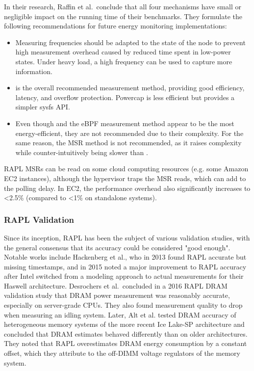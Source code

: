In their research, Raffin et al.\ conclude that all four mechanisms have small or negligible impact on the running time of their benchmarks. They formulate the following recommendations for future energy monitoring implementations:
\begin{itemize}
    \item Measuring frequencies should be adapted to the state of the node to prevent high measurement overhead caused by reduced time spent in low-power states. Under heavy load, a high frequency can be used to capture more information.
    \item {} is the overall recommended measurement method, providing good efficiency, latency, and overflow protection. Powercap is less efficient but provides a simpler sysfs API.
    \item Even though  and the eBPF measurement method appear to be the most energy-efficient, they are not recommended due to their complexity. For the same reason, the MSR method is not recommended, as it raises complexity while counter-intuitively being slower than .
\end{itemize}

RAPL MSRs can be read on some cloud computing resources (e.g. some Amazon EC2 instances), although the hypervisor traps the MSR reads, which can add to the polling delay. In EC2, the performance overhead also significantly increases to <2.5\% (compared to <1\% on standalone systems)\parencite{jay2023experimental}.

\subsubsection{RAPL Validation}
\label{sec:raplvalidation}

Since its inception, RAPL has been the subject of various validation studies, with the general consensus that its accuracy could be considered "good enough"\parencite{raffin2024dissecting}. Notable works include Hackenberg et al., who in 2013 found RAPL accurate but missing timestamps\parencite{hackenberg2013power}, and in 2015 noted a major improvement to RAPL accuracy after Intel switched from a modeling approach to actual measurements for their Haswell architecture\parencite{hackenberg2015energy}. Desrochers et al.\ concluded in a 2016 RAPL DRAM validation study\parencite{desrochers2016validation} that DRAM power measurement was reasonably accurate, especially on server-grade CPUs. They also found measurement quality to drop when measuring an idling system. Later, Alt et al.\parencite{alt2024experimental} tested DRAM accuracy of heterogeneous memory systems of the more recent Ice Lake-SP architecture and concluded that DRAM estimates behaved differently than on older architectures. They noted that RAPL overestimates DRAM energy consumption by a constant offset, which they attribute to the off-DIMM voltage regulators of the memory system.

